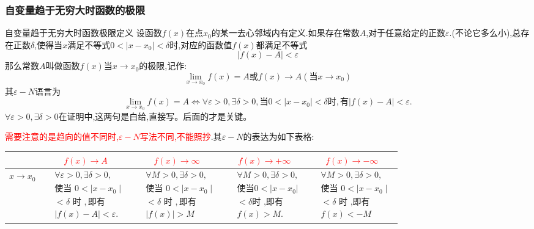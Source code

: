 \documentclass[8pt a4paper, oneside, UTF8]{ctexbook}
\begin{document}
\begin{sloppypar}
    \subsubsection{自变量趋于无穷大时函数的极限}
    \begin{defn}{自变量趋于无穷大时函数极限定义}{}
        设函数$f(x)$在点$x_0$的某一去心邻域内有定义.如果存在常数$A$,对于任意给定的正数$\varepsilon$.(不论它多么小),总存在正数$\delta$,使得当$x$满足不等式$0<|x-x_0|<\delta$时,对应的函数值$f(x)$都满足不等式
        $$
            |f(x)-A|<\varepsilon
        $$
        那么常数$A$叫做函数$f(x)$当$x \to x_0$的极限,记作:
        $$
            \lim_{x\to x_0}f(x)=A\text{或}f(x)\to A(\text{当}x\to x_0)
        $$
        其$\varepsilon-N$语言为
        $$
            \lim\limits_{x\to x_0}f(x)=A\Leftrightarrow\forall\varepsilon>0,\exists\delta>0,\text{当}0<|x-x_0|<\delta\text{时},\text{有}|f(x)-A|<\varepsilon.
        $$
        $\forall\varepsilon>0,\exists\delta>0$在证明中,这两句是白给,直接写。后面的才是关键。
    \end{defn}
    \textcolor{red}{需要注意的是趋向的值不同时,$\varepsilon -N$写法不同,不能照抄}.其$\varepsilon -N$的表达为如下表格:
    \begin{center}
        \begin{tabular}{|c|c|c|c|c|}
            \hline
            & \textcolor{red}{$f(x)\to A$} & \textcolor{red}{$f(x)\to \infty$} & \textcolor{red}{$f(x)\to +\infty$} & \textcolor{red}{$f(x)\to -\infty$}\\
            \hline
            $x \to x_0$       & $\begin{aligned}&\forall\varepsilon>0,\exists\delta>0, \\&\text{使当 }0<\mid x-x_0\mid  \\&<\delta\text{ 时 },\text{即有} \\&|f(x)-A|<\varepsilon.\end{aligned}$ & $\begin{aligned}&\forall M>0,\exists\delta>0, \\&\text{使当 }0<\mid x-x_{0}\mid  \\&<\delta\text{ 时 },\text{即有}\\& |f(x)|>M\end{aligned}$ & $\begin{aligned}&\forall M>0,\exists\delta>0, \\&\text{使当} 0<|x-x_0| \\ &<\delta \text{时 ,即有} \\ &f(x)>M.\end{aligned}$      & $\begin{aligned}&\forall M>0,\exists\delta>0, \\&\text{使当 }0<\mid x-x_{0}\mid  \\&<\delta\text{ 时 ,即有}\\& f(x) <-M\end{aligned}$ \\ \hline

\end{tabular}
\end{center}
\end{sloppypar}
\end{document}
